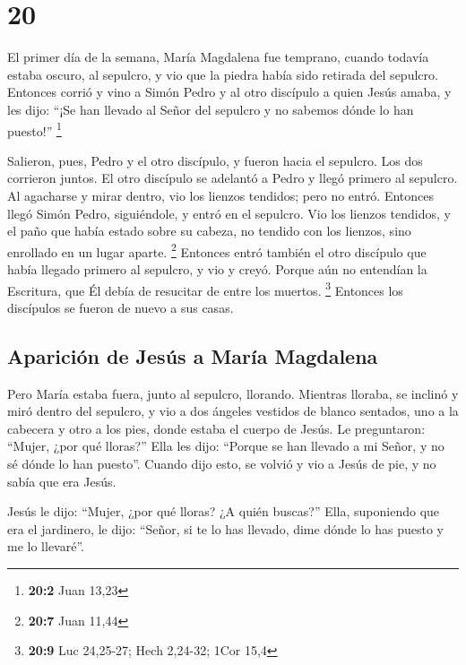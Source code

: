 \hypertarget{section-19}{%
\section{20}\label{section-19}}

 El primer día de la semana, María Magdalena fue temprano,
cuando todavía estaba oscuro, al sepulcro, y vio que la piedra había
sido retirada del sepulcro.  Entonces corrió y vino a
Simón Pedro y al otro discípulo a quien Jesús amaba, y les dijo: ``¡Se
han llevado al Señor del sepulcro y no sabemos dónde lo han puesto!''
\footnote{\textbf{20:2} Juan 13,23}

 Salieron, pues, Pedro y el otro discípulo, y fueron hacia
el sepulcro.  Los dos corrieron juntos. El otro discípulo
se adelantó a Pedro y llegó primero al sepulcro.  Al
agacharse y mirar dentro, vio los lienzos tendidos; pero no entró.
 Entonces llegó Simón Pedro, siguiéndole, y entró en el
sepulcro. Vio los lienzos tendidos,  y el paño que había
estado sobre su cabeza, no tendido con los lienzos, sino enrollado en un
lugar aparte. \footnote{\textbf{20:7} Juan 11,44} 
Entonces entró también el otro discípulo que había llegado primero al
sepulcro, y vio y creyó.  Porque aún no entendían la
Escritura, que Él debía de resucitar de entre los muertos. \footnote{\textbf{20:9}
  Luc 24,25-27; Hech 2,24-32; 1Cor 15,4}  Entonces los
discípulos se fueron de nuevo a sus casas.

\hypertarget{apariciuxf3n-de-jesuxfas-a-maruxeda-magdalena}{%
\subsection{Aparición de Jesús a María
Magdalena}\label{apariciuxf3n-de-jesuxfas-a-maruxeda-magdalena}}

 Pero María estaba fuera, junto al sepulcro, llorando.
Mientras lloraba, se inclinó y miró dentro del sepulcro, 
y vio a dos ángeles vestidos de blanco sentados, uno a la cabecera y
otro a los pies, donde estaba el cuerpo de Jesús.  Le
preguntaron: ``Mujer, ¿por qué lloras?'' Ella les dijo: ``Porque se han
llevado a mi Señor, y no sé dónde lo han puesto''. 
Cuando dijo esto, se volvió y vio a Jesús de pie, y no sabía que era
Jesús.

 Jesús le dijo: ``Mujer, ¿por qué lloras? ¿A quién
buscas?'' Ella, suponiendo que era el jardinero, le dijo: ``Señor, si te
lo has llevado, dime dónde lo has puesto y me lo llevaré''.

